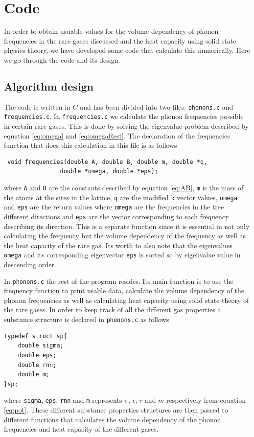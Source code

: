 \documentclass[11pt]{article}
\begin{document}
\section{Code}
In order to obtain usuable values for the volume dependency of phonon frequencies in the rare gases discussed and the heat capacity using solid state physics theory, we have developed some code that calculate this numerically. Here we go through the code and its design.
\subsection{Algorithm design}
The code is written in $C$ and has been divided into two files: \verb+phonons.c+ and \verb+frequencies.c+. In \verb+frequencies.c+ we calculate the phonon frequencies possible in certain rare gases. This is done by solving the eigenvalue problem described by equation \ref{eq:omega} and \ref{eq:omegaRest}. The declaration of the frequencies function that does this calculation in this file is as follows
\begin{lstlisting}
 void frequencies(double A, double B, double m, double *q, 
				double *omega, double *eps);
\end{lstlisting}
where \verb+A+ and \verb+B+ are the constants described by equation \ref{eq:AB}, \verb+m+ is the mass of the atoms at the sites in the lattice, \verb+q+ are the modified k vector values, \verb+omega+ and \verb+eps+ are the return values where \verb+omega+ are the frequencies in the tree different directions and \verb+eps+ are the vector corresponding to each frequency describing its direction. This is a separate function since it is essential in not only calculating the frequency but the volume dependency of the frequency as well as the heat capacity of the rare gas. Its worth to also note that the eigenvalues \verb+omega+ and its corresponding eigenvector \verb+eps+ is sorted so by eigenvalue value in descending order.

In \verb+phonons.c+ the rest of the program resides. Its main function is to use the frequency function to print usable data, calculate the volume dependency of the phonon frequencies as well as calculating heat capacity using solid state theory of the rare gases. In order to keep track of all the different gas properties a substance structure is declared in \verb+phonons.c+ as follows
\begin{lstlisting}
typedef struct sp{
	double sigma;
	double eps;
	double rnn;
	double m;
}sp;
\end{lstlisting}
where \verb+sigma+, \verb+eps+, \verb+rnn+ and \verb+m+ represents $\sigma$, $\epsilon$, $r$ and $m$ respectively from equation \ref{eq:pot}. These different substance properties structures are then passed to different functions that calculates the volume dependency of the phonon frequencies and heat capacity of the different gases.
\end{document}
